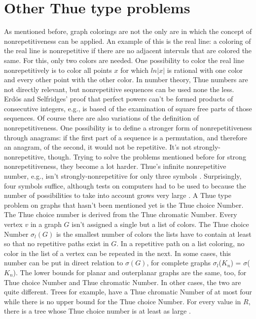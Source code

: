 \documentclass[12pt,a4paper]{article}
\begin{document}
\newpage
\section{Other Thue type problems}
As mentioned before, graph colorings are not the only are in which the concept of nonrepetitiveness can be applied. An example of this is the real line: a coloring of the real line is nonrepetitive if there are no adjacent intervals that are colored the same. For this, only two colors are needed. One possibility to color the real line nonrepetitively is to color all points $x$ for which $ln|x|$ is rational with one color and every other point with the other color\citep{Grytczuk2008}. 
\newline
In number theory, Thue numbers are not directly relevant, but nonrepetitive sequences can be used none the less. Erdös and Selfridges' proof that perfect powers can't be formed products of consecutive integers, e.g., is based of the examination of square free parts of those sequences.
\newline
Of course there are also variations of the definition of nonrepetitiveness. One possibility is to define a stronger form of nonrepetitiveness through anagrams: if the first part of a sequence is a permutation, and therefore an anagram, of the second, it would not be repetitive. It's not strongly-nonrepetitive, though. Trying to solve the problems mentioned before for strong nonrepetitiveness, they become a lot harder. Thue's infinite nonrepetitive number, e.g., isn't strongly-nonrepetitive for only three symbols \citep{Grytczuk2008}. Surprisingly, four symbols suffice, although tests on computers had to be used to because the number of possibilities to take into account grows very large \citep{Keranen1992}.
\newline
A Thue type problem on graphs that hasn't been mentioned yet is the Thue choice Number. The Thue choice number is derived from the Thue chromatic Number. Every vertex $v$ in a graph $G$ isn't assigned a single but a list of colors. The Thue choice Number $\sigma_l(G)$ is the smallest number of colors the lists have to contain at least so that no repetitive paths exist in $G$. In a repetitive path on a list coloring, no color in the list of a vertex can be repeated in the next. In some cases, this number can be put in direct relation to $\sigma(G)$, for complete graphs $\sigma_l$($K_n$) = $\sigma$($K_n$). The lower bounds for planar and outerplanar graphs are the same, too, for Thue choice Number and Thue chromatic Number. In other cases, the two are quite different. Trees for example, have a Thue chromatic Number of at most four while there is no upper bound for the Thue choice Number. For every value in $R$, there is a tree whose Thue choice number is at least as large \citep{Skrabulakova2015}.
\end{document}
